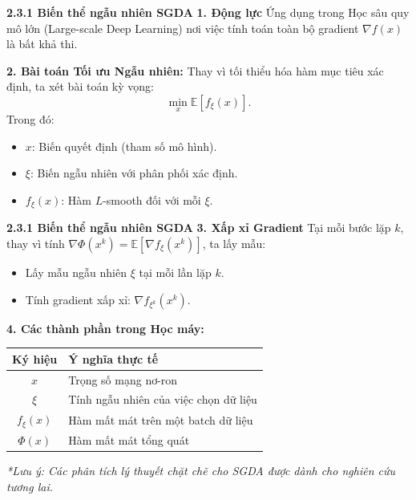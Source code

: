 \begin{frame}{\textbf{\large 2.3.1 Biến thể ngẫu nhiên SGDA}}
    \vspace*{-1cm}
    \textbf{1. Động lực}
    Ứng dụng trong Học sâu quy mô lớn (Large-scale Deep Learning) nơi việc tính toán toàn bộ gradient $\nabla f(x)$ là bất khả thi.

    \textbf{2. Bài toán Tối ưu Ngẫu nhiên:}
    Thay vì tối thiểu hóa hàm mục tiêu xác định, ta xét bài toán kỳ vọng:
    \begin{equation} \label{eq:stochastic_prob}
         \min_{x} \mathbb{E}[f_{\xi}(x)].
    \end{equation}
    Trong đó:
    \begin{itemize}
        \item $x$: Biến quyết định (tham số mô hình).
        \item $\xi$: Biến ngẫu nhiên với phân phối xác định.
        \item $f_{\xi}(x)$: Hàm $L$-smooth đối với mỗi $\xi$.
    \end{itemize}
\end{frame}


\begin{frame}{\textbf{\large 2.3.1 Biến thể ngẫu nhiên SGDA}}
    \vspace*{-1.5cm}
    \textbf{3. Xấp xỉ Gradient}
    Tại mỗi bước lặp $k$, thay vì tính $\nabla \Phi(x^k) = \mathbb{E}[\nabla f_{\xi}(x^k)]$, ta lấy mẫu:
    \begin{itemize}
        \item Lấy mẫu ngẫu nhiên $\xi$ tại mỗi lần lặp $k$. 
        \item Tính gradient xấp xỉ: $\nabla f_{\xi^k}(x^k)$.
    \end{itemize}

    \textbf{4. Các thành phần trong Học máy:}
    \begin{table}[]
        \centering
        \begin{tabular}{c|l}
            \textbf{Ký hiệu} & \textbf{Ý nghĩa thực tế} \\
            \hline
            $x$ & Trọng số mạng nơ-ron  \\
            $\xi$ & Tính ngẫu nhiên của việc chọn dữ liệu \\
            $f_{\xi}(x)$ & Hàm mất mát trên một batch dữ liệu \\
            $\Phi(x)$ & Hàm mất mát tổng quát 
        \end{tabular}
    \end{table}
    
    \textit{*Lưu ý: Các phân tích lý thuyết chặt chẽ cho SGDA được dành cho nghiên cứu tương lai.}
\end{frame}

